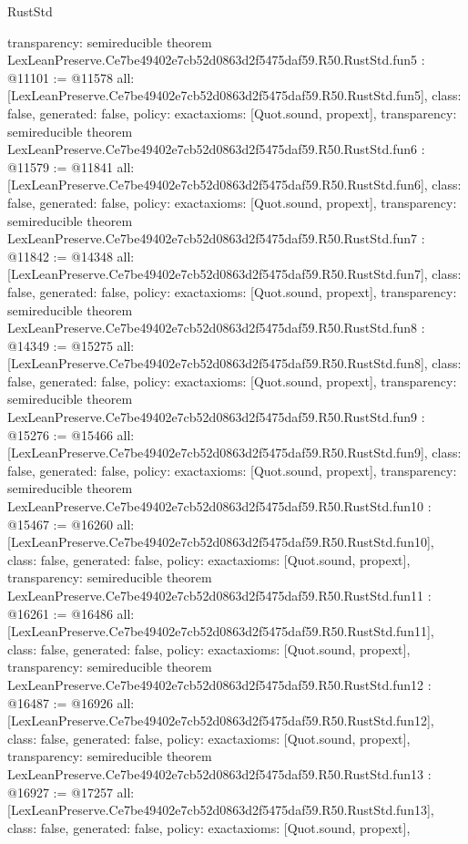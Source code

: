 \begin{lexlean}{RustStd}
\begin{coremodule}
{  transparency: semireducible
}
theorem LexLeanPreserve.Ce7be49402e7cb52d0863d2f5475daf59.R50.RustStd.fun5 : @11101 := @11578 {
  all: [LexLeanPreserve.Ce7be49402e7cb52d0863d2f5475daf59.R50.RustStd.fun5],
  class: false,
  generated: false,
  policy: exact{axioms: [Quot.sound, propext]},
  transparency: semireducible
}
theorem LexLeanPreserve.Ce7be49402e7cb52d0863d2f5475daf59.R50.RustStd.fun6 : @11579 := @11841 {
  all: [LexLeanPreserve.Ce7be49402e7cb52d0863d2f5475daf59.R50.RustStd.fun6],
  class: false,
  generated: false,
  policy: exact{axioms: [Quot.sound, propext]},
  transparency: semireducible
}
theorem LexLeanPreserve.Ce7be49402e7cb52d0863d2f5475daf59.R50.RustStd.fun7 : @11842 := @14348 {
  all: [LexLeanPreserve.Ce7be49402e7cb52d0863d2f5475daf59.R50.RustStd.fun7],
  class: false,
  generated: false,
  policy: exact{axioms: [Quot.sound, propext]},
  transparency: semireducible
}
theorem LexLeanPreserve.Ce7be49402e7cb52d0863d2f5475daf59.R50.RustStd.fun8 : @14349 := @15275 {
  all: [LexLeanPreserve.Ce7be49402e7cb52d0863d2f5475daf59.R50.RustStd.fun8],
  class: false,
  generated: false,
  policy: exact{axioms: [Quot.sound, propext]},
  transparency: semireducible
}
theorem LexLeanPreserve.Ce7be49402e7cb52d0863d2f5475daf59.R50.RustStd.fun9 : @15276 := @15466 {
  all: [LexLeanPreserve.Ce7be49402e7cb52d0863d2f5475daf59.R50.RustStd.fun9],
  class: false,
  generated: false,
  policy: exact{axioms: [Quot.sound, propext]},
  transparency: semireducible
}
theorem LexLeanPreserve.Ce7be49402e7cb52d0863d2f5475daf59.R50.RustStd.fun10 : @15467 := @16260 {
  all: [LexLeanPreserve.Ce7be49402e7cb52d0863d2f5475daf59.R50.RustStd.fun10],
  class: false,
  generated: false,
  policy: exact{axioms: [Quot.sound, propext]},
  transparency: semireducible
}
theorem LexLeanPreserve.Ce7be49402e7cb52d0863d2f5475daf59.R50.RustStd.fun11 : @16261 := @16486 {
  all: [LexLeanPreserve.Ce7be49402e7cb52d0863d2f5475daf59.R50.RustStd.fun11],
  class: false,
  generated: false,
  policy: exact{axioms: [Quot.sound, propext]},
  transparency: semireducible
}
theorem LexLeanPreserve.Ce7be49402e7cb52d0863d2f5475daf59.R50.RustStd.fun12 : @16487 := @16926 {
  all: [LexLeanPreserve.Ce7be49402e7cb52d0863d2f5475daf59.R50.RustStd.fun12],
  class: false,
  generated: false,
  policy: exact{axioms: [Quot.sound, propext]},
  transparency: semireducible
}
theorem LexLeanPreserve.Ce7be49402e7cb52d0863d2f5475daf59.R50.RustStd.fun13 : @16927 := @17257 {
  all: [LexLeanPreserve.Ce7be49402e7cb52d0863d2f5475daf59.R50.RustStd.fun13],
  class: false,
  generated: false,
  policy: exact{axioms: [Quot.sound, propext]},
}
\end{coremodule}
\end{lexlean}
